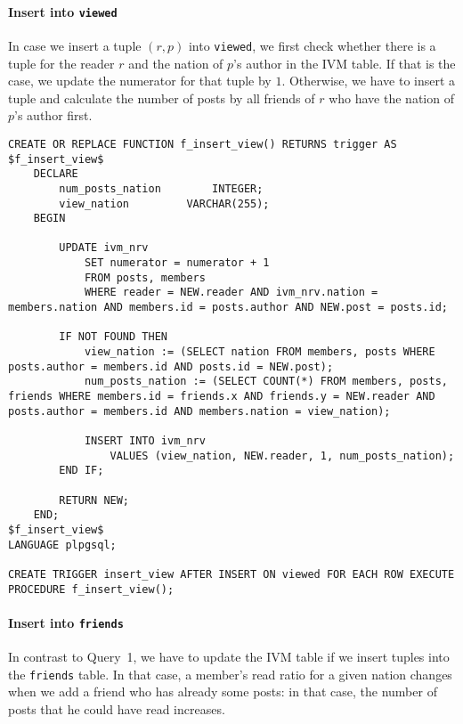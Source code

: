 \documentclass[12pt]{article}
\begin{document}
\paragraph{Insert into \lstinline{viewed}}
In case we insert a tuple $(r,p)$ into \lstinline{viewed}, we first check whether there is a tuple for the reader $r$ and the nation of $p$'s author in the IVM table. If that is the case, we update the numerator for that tuple by $1$. Otherwise, we have to insert a tuple and calculate the number of posts by all friends of $r$ who have the nation of $p$'s author first.
\newpage
\begin{lstlisting}
CREATE OR REPLACE FUNCTION f_insert_view() RETURNS trigger AS 
$f_insert_view$
	DECLARE
		num_posts_nation		INTEGER;
		view_nation			VARCHAR(255);
	BEGIN

		UPDATE ivm_nrv
			SET numerator = numerator + 1
			FROM posts, members
			WHERE reader = NEW.reader AND ivm_nrv.nation = members.nation AND members.id = posts.author AND NEW.post = posts.id;
            
		IF NOT FOUND THEN
			view_nation := (SELECT nation FROM members, posts WHERE posts.author = members.id AND posts.id = NEW.post);
			num_posts_nation := (SELECT COUNT(*) FROM members, posts, friends WHERE members.id = friends.x AND friends.y = NEW.reader AND posts.author = members.id AND members.nation = view_nation);
			
			INSERT INTO ivm_nrv
				VALUES (view_nation, NEW.reader, 1, num_posts_nation);
		END IF;

		RETURN NEW;
	END;
$f_insert_view$
LANGUAGE plpgsql;

CREATE TRIGGER insert_view AFTER INSERT ON viewed FOR EACH ROW EXECUTE PROCEDURE f_insert_view();
\end{lstlisting}

\paragraph{Insert into \lstinline{friends}}
In contrast to Query~1, we have to update the IVM table if we insert tuples into the \lstinline{friends} table. In that case, a member's read ratio for a given nation changes when we add a friend who has already some posts: in that case, the number of posts that he could have read increases.
\end{document}

